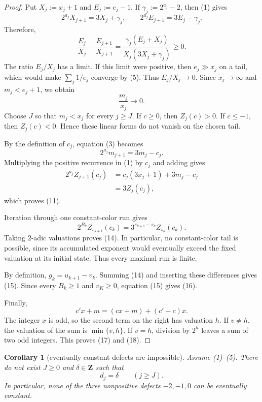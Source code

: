 \documentclass[11pt]{article}
\newtheorem{corollary}[theorem]{Corollary}
\begin{document}
\begin{proof}
Put $X_j:=x_j+1$ and $E_j:=e_j-1$.  If
$\gamma_j:=2^{a_j}-2$, then (1) gives
\[
  2^{a_j}X_{j+1}=3X_j+\gamma_j,
  \qquad
  2^{a_j}E_{j+1}=3E_j-\gamma_j.
\]
Therefore,
\[
  \frac{E_j}{X_j}-\frac{E_{j+1}}{X_{j+1}}
  =\frac{\gamma_j(E_j+X_j)}{X_j(3X_j+\gamma_j)}
  \geq0.
\]
The ratio $E_j/X_j$ has a limit.  If this limit were positive, then
$e_j\gg x_j$ on a tail, which would make $\sum_j1/e_j$ converge by (5).
Thus $E_j/X_j\to0$.  Since $x_j\to\infty$ and $m_j<e_j+1$, we obtain
\[
  \frac{m_j}{x_j}\longrightarrow0.
  \tag{19}
\]
Choose $J$ so that $m_j<x_j$ for every $j\geq J$.  If $c\geq0$, then
$Z_j(c)>0$.  If $c\leq-1$, then $Z_j(c)<0$.  Hence these linear forms do
not vanish on the chosen tail.

By the definition of $c_j$, equation (3) becomes
\[
  2^{a_j}m_{j+1}=3m_j-c_j.
\]
Multiplying the positive recurrence in (1) by $c_j$ and adding gives
\[
\begin{aligned}
  2^{a_j}Z_{j+1}(c_j)
  &=c_j(3x_j+1)+3m_j-c_j\\
  &=3Z_j(c_j),
\end{aligned}
\]
which proves (11).

Iteration through one constant-color run gives
\[
  2^{B_k}Z_{s_{k+1}}(c_k)
  =3^{s_{k+1}-s_k}Z_{s_k}(c_k).
  \tag{20}
\]
Taking $2$-adic valuations proves (14).  In particular, no constant-color
tail is possible, since its accumulated exponent would eventually exceed
the fixed valuation at its initial state.  Thus every maximal run is
finite.

By definition, $g_k=u_{k+1}-v_k$.  Summing (14) and inserting these
differences gives (15).  Since every $B_k\geq1$ and $v_K\geq0$, equation
(15) gives (16).

Finally,
\[
  c'x+m=(cx+m)+(c'-c)x.
  \tag{21}
\]
The integer $x$ is odd, so the second term on the right has valuation $h$.
If $v\neq h$, the valuation of the sum is $\min\{v,h\}$.  If $v=h$,
division by $2^h$ leaves a sum of two odd integers.  This proves (17) and
(18).
\end{proof}

\begin{corollary}[eventually constant defects are impossible]
Assume (1)--(5).  There do not exist $J\geq0$ and
$\delta\in\mathbf Z$ such that
\[
  d_j=\delta\qquad(j\geq J).
  \tag{22}
\]
In particular, none of the three nonpositive defects $-2,-1,0$ can be
eventually constant.
\end{corollary}
\end{document}
